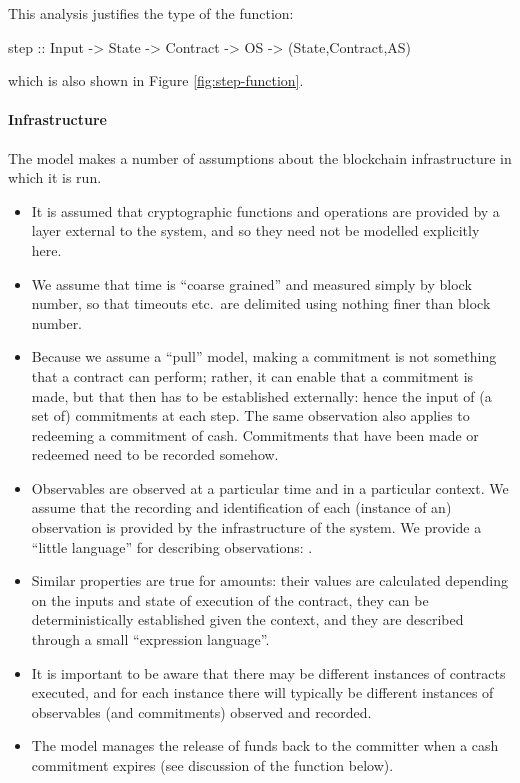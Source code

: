 \documentclass[
      acmsmall
    , screen
  ]{acmart}
\begin{document}
This analysis justifies the type of the  function:

\begin{haskellcode}
step :: Input -> State -> Contract -> OS -> (State,Contract,AS)
\end{haskellcode}

which is also shown in Figure \ref{fig:step-function}.

\paragraph{Infrastructure}

The model makes a number of assumptions about the blockchain infrastructure in which it is run.

\begin{itemize}
\item It is assumed that cryptographic functions and operations are provided by a layer external to the system, and so they need not be modelled explicitly here.
\item We assume that time is ``coarse grained'' and measured simply by block number, so that timeouts etc.\ are delimited using nothing finer than block number. 
\item Because we assume a ``pull'' model, making a commitment is not something that a contract can perform; rather, it can enable that a commitment is made, but that then has to be established externally: hence the input of (a set of) commitments at each step. The same observation also applies to redeeming a commitment of cash. Commitments that have been made or redeemed need to be recorded somehow.

\item Observables are observed at a particular time and in a particular context. We assume that the recording and 
identification of each (instance of an) observation is provided by the infrastructure of the system. We provide a 
``little language'' for describing observations: . 
\item
Similar properties are true for
 amounts: their values are calculated depending on the inputs and state of execution of the 
contract, they can be deterministically established given the context, and they are described through a small 
``expression language''.
\item It is important to be aware that there may be different instances of contracts executed, and for each instance there will typically be different instances of observables (and commitments) observed and recorded.
\item The model manages the release of funds back to the committer when a cash commitment expires (see discussion of the  function below).
\end{itemize}
\end{document}
